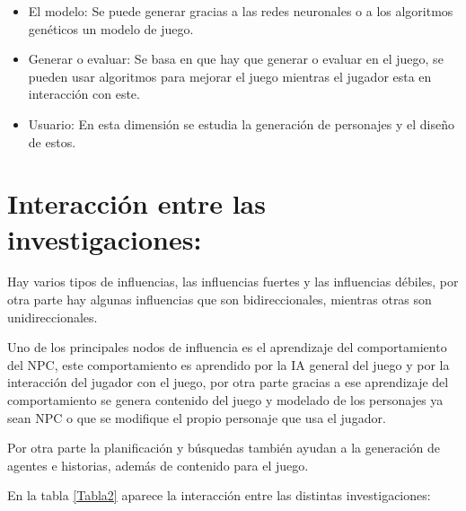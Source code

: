 \begin{itemize}

	\item El modelo: Se puede generar gracias a las redes neuronales o a los algoritmos 	genéticos un modelo de juego\cite{B1}.\\
		
	\item Generar o evaluar: Se basa en que hay que generar o evaluar en el juego, se pueden 	usar algoritmos para mejorar el juego mientras el jugador esta en interacción con este\cite{B1}.\\

	\item Usuario: En esta dimensión se estudia la generación de personajes y el diseño de 	estos\cite{B1}.\\  
	
\end{itemize}

\section{Interacción entre las investigaciones:}

Hay varios tipos de influencias, las influencias fuertes y las influencias débiles, por otra parte hay algunas influencias que son bidireccionales, mientras otras son unidireccionales\cite{B1}.

Uno de los principales nodos de influencia es el aprendizaje del comportamiento del NPC, este comportamiento es aprendido por la IA general del juego y por la interacción del jugador con el juego, por otra parte gracias a ese aprendizaje del comportamiento se genera contenido del juego y modelado de los personajes ya sean NPC o que se modifique el propio personaje que usa el jugador.

Por otra parte la planificación y búsquedas también ayudan a la generación de agentes e historias, además de contenido para el juego.

En la tabla \ref{Tabla2} aparece la interacción entre las distintas investigaciones:\\


